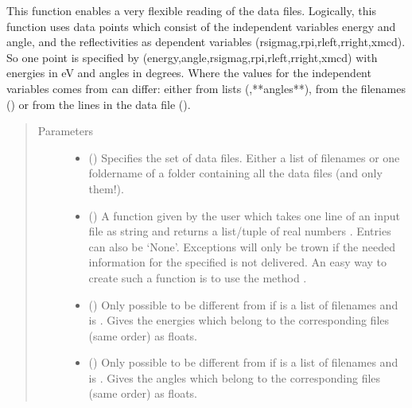 \documentclass[letterpaper,10pt,english]{sphinxmanual}
\begin{document}
\begin{fulllineitems}
\begin{fulllineitems}
This function enables a very flexible reading of the data files.
Logically, this function uses data points which consist of the independent variables energy and angle, and the reflectivities as dependent variables (rsigmag,rpi,rleft,rright,xmcd).
So one point is specified by (energy,angle,rsigmag,rpi,rleft,rright,xmcd)  with energies in eV and angles in degrees.
Where the values for the independent variables comes from can differ: either from lists (,**angles**), from the filenames () or from the lines in the data file ().
\begin{quote}\begin{description}
\item[{Parameters}] \leavevmode\begin{itemize}
\item {} 
 () \textendash{} Specifies the set of data files. Either a list of filenames or one foldername of a folder containing all the data files (and only them!).

\item {} 
 () \textendash{} A function given by the user which takes one line of an input file as string and returns a list/tuple of real numbers . Entries can also be ‘None’. Exceptions will only be trown if the needed information for the specified  is not delivered. An easy way to create such a function is to use the method {\hyperref[\detokenize{modules-api/experiment:Experiment.ReflDataSimulator.createLinereader}]{}}.

\item {} 
 () \textendash{} Only possible to be different from  if  is a list of filenames and  is . Gives the energies which belong to the corresponding files (same order) as floats.

\item {} 
 () \textendash{} Only possible to be different from  if  is a list of filenames and  is . Gives the angles which belong to the corresponding files (same order) as floats.


\end{itemize}
\end{description}
\end{quote}
\end{fulllineitems}
\end{fulllineitems}
\end{document}
